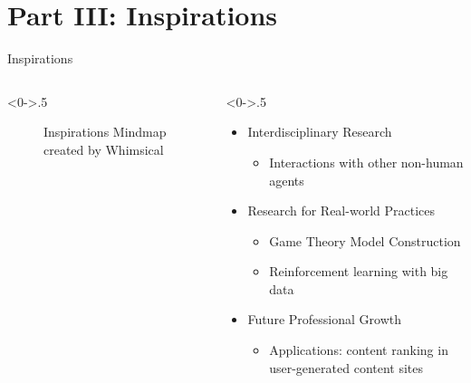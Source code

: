 \documentclass{beamer}
\begin{document}
			   
		
	\section{Part III: Inspirations}

 \begin{frame}{Inspirations}
 
		\begin{columns}[T]
			\begin{column}<0->{.5\textwidth}
				\begin{figure}[thpb]
					\centering
					\caption{Inspirations Mindmap created by Whimsical}
					\label{fig:1}
				\end{figure}
			\end{column}%
			\hfill%
			\begin{column}<0->{.5\textwidth}
				\begin{itemize}
				\item<1-> Interdisciplinary Research
			\begin{itemize}
			    \item <1-> Interactions with other non-human agents
			\end{itemize}	\item<2->Research for Real-world Practices
			\begin{itemize}
			    \item<2-> Game Theory Model Construction
			    \item<2->Reinforcement learning with big data
			\end{itemize}	\item<3->Future Professional Growth
			\begin{itemize}
			    \item Applications: content ranking in user-generated content sites
			\end{itemize}
					\end{itemize}
			\end{column}
		\end{columns}
	\end{frame}	
\end{document}
